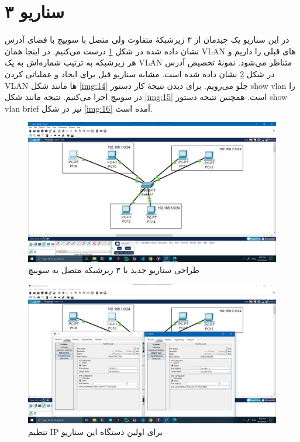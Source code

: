 \documentclass[12pt]{article}
\begin{document}
	\newpage
	\section{سناریو ۳}
	در این سناریو یک چیدمان از ۳ زیرشبکهٔ متفاوت ولی متصل با سوییچ با فضای آدرس نشان داده شده در شکل \ref{img:12} درست می‌کنیم. در اینجا همان \textenglish{VLAN} های قبلی را داریم و هر زیرشبکه به ترتیب شماره‌اش به یک \textenglish{VLAN} متناظر می‌شود. نمونهٔ تخصیص آدرس در شکل \ref{img:13} نشان داده شده است. مشابه سناریو قبل برای ایجاد و عملیاتی کردن \textenglish{VLAN} ها مانند شکل \ref{img:14} جلو می‌رویم. برای دیدن نتیجهٔ کار دستور \textenglish{show vlan} را در سوییچ اجرا می‌کنیم. نتیجه مانند شکل \ref{img:15} است. همچنین نتیجه دستور \textenglish{show vlan brief} نیز در شکل \ref{img:16} آمده است.
	\begin{figure}[H]
		\centering
		\includegraphics[width=\textwidth]{resources/12.png}
		\caption{طراحی سناریو جدید با ۳ زیرشبکه متصل به سوییچ}
		\label{img:12}
	\end{figure}
	\begin{figure}[H]
		\centering
		\includegraphics[width=\textwidth]{resources/13.png}
		\caption{تنظیم \textenglish{IP} برای اولین دستگاه این سناریو}
		\label{img:13}
	\end{figure}
\end{document}
